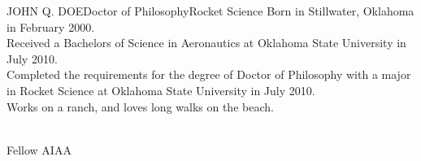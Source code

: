 \newpage
\begin{vita}{JOHN Q. DOE}{Doctor of Philosophy}{Rocket Science} %
     Born in Stillwater, Oklahoma in February 2000.
     \\ Received a Bachelors of Science in Aeronautics at Oklahoma State University in July 2010. \\
Completed the requirements for the degree of Doctor of Philosophy with a major in Rocket Science at Oklahoma State University in July 2010.
     \\ Works on a ranch, and loves long walks on the beach.

     \\ Fellow AIAA
\end{vita}
